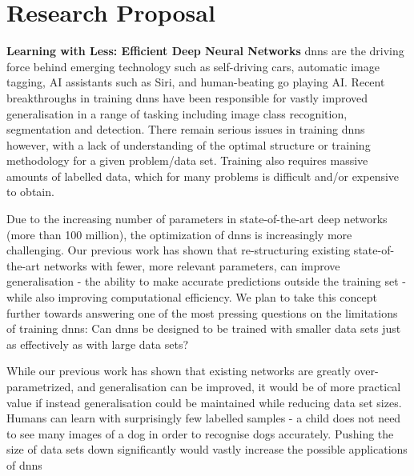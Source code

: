 \documentclass[]{article}
\begin{document}
\section{Research Proposal}
\textbf{Learning with Less: Efficient Deep Neural Networks}
\Glspl{dnn} are the driving force behind emerging technology such as self-driving cars, automatic image tagging, AI assistants such as Siri, and human-beating go playing AI. Recent breakthroughs in training \glspl{dnn} have been responsible for vastly improved generalisation in a range of tasking including image class recognition, segmentation and detection. There remain serious issues in training \glspl{dnn} however, with a lack of understanding of the optimal structure or training methodology for a given problem/data set. Training also requires massive amounts of labelled data, which for many problems is difficult and/or expensive to obtain.

Due to the increasing number of parameters in state-of-the-art deep networks (more than 100 million), the optimization of \glspl{dnn} is increasingly more challenging. Our previous work has shown that re-structuring existing state-of-the-art networks with fewer, more relevant parameters, can improve generalisation - the ability to make accurate predictions outside the training set - while also improving computational efficiency. We plan to take this concept further towards answering one of the most pressing questions on the limitations of training \glspl{dnn}: Can \glspl{dnn} be designed to be trained with smaller data sets just as effectively as with large data sets?

While our previous work has shown that existing networks are greatly over-parametrized, and generalisation can be improved, it would be of more practical value if instead generalisation could be maintained while reducing data set sizes. Humans can learn with surprisingly few labelled samples - a child does not need to see many images of a dog in order to recognise dogs accurately. Pushing the size of data sets down significantly would vastly increase the possible applications of \glspl{dnn}
\end{document}
